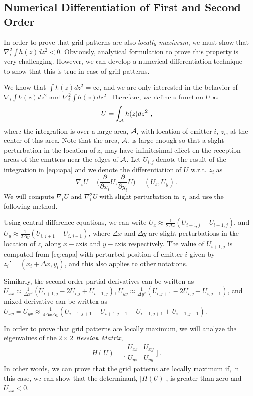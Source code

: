 \documentclass[12pt,english]{article}
\begin{document}
\subsection{Numerical Differentiation of First and Second Order}
\label{sec:grid_second_order}

In order to prove that grid patterns are also {\em locally maximum}, we must show that
$
\nabla_i^2 \int h(z) dz^2 < 0
$.
Obviously, analytical formulation to prove this property is very challenging. However, we can develop a numerical differentiation technique to show that this is true in case of grid patterns. 

We know that \mbox{$\int h(z)dz^2=\infty$}, and we are only interested in the behavior of $\nabla_i \int h(z)dz^2$ and $\nabla_i^2 \int h(z)dz^2$. Therefore, we define a function $U$ as
\begin{equation}
U=\int_{\cal A} h(z) dz^2~,
\label{eq:capa}
\end{equation}
where the integration is over a large area, ${\cal A}$, with location of emitter $i$, $z_i$, at the center of this area. Note that the area, ${\cal A}$, is large enough so that a slight perturbation in the location of $z_i$ may have infinitesimal effect on the reception areas of the emitters near the edges of ${\cal A}$. Let $U_{i,j}$ denote the result of the integration in \eqref{eq:capa} and we denote the differentiation of $U$ w.r.t. $z_i$ as
$$
\nabla_i U=\Big(\frac{\partial}{\partial x_i}U,\frac{\partial}{\partial y_i}U\Big)=(U_x,U_y)~.
$$
We will compute $\nabla_i U$ and $\nabla_i^2 U$ with slight perturbation in $z_i$ and use the following method. 

Using central difference equations, we can write
$
U_x\approx \frac{1}{2\Delta x}(U_{i+1,j} -U_{i-1,j})
$,
and
$
U_y\approx \frac{1}{2\Delta y}(U_{i,j+1} -U_{i,j-1})
$,
where $\Delta x$ and $\Delta y$ are slight perturbations in the location of $z_i$ along $x-$axis and $y-$axis respectively. The value of $U_{i+1,j}$ is computed from \eqref{eq:capa} with perturbed position of emitter $i$ given by $z_i'=(x_i+\Delta x,y_i)$, and this also applies to other notations.

Similarly, the second order partial derivatives can be written as
$
U_{xx}\approx \frac{1}{\Delta x^2}(U_{i+1,j}-2U_{i,j}+U_{i-1,j})
$,
$
U_{yy}\approx \frac{1}{\Delta y^2}(U_{i,j+1}-2U_{i,j}+U_{i,j-1})
$,
and mixed derivative can be written as
$
U_{xy}=U_{yx}\approx \frac{1}{4\Delta x \Delta y}(U_{i+1,j+1}-U_{i+1,j-1}-U_{i-1,j+1}+U_{i-1,j-1})
$. 

In order to prove that grid patterns are locally maximum, we will analyze the eigenvalues of the $2\times2$ {\em Hessian Matrix},
$$
H(U)=\Big[\begin{array}{cc}
U_{xx} & U_{xy}\\
U_{yx} & U_{yy}\end{array}\Big]~.
$$
In other words, we can prove that the grid patterns are locally maximum if, in this case, we can show that the determinant, $|H(U)|$, is greater than zero and \mbox{$U_{xx}<0$}. 
\end{document}
